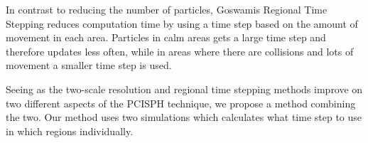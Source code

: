 \documentclass[../../main.tex]{subfiles}
\begin{document}
In contrast to reducing the number of particles, Goswamis Regional Time Stepping \cite{} reduces computation time by using a time step based on the amount of movement in each area. Particles in calm areas gets a large time step and therefore updates less often, while in areas where there are collisions and lots of movement a smaller time step is used. 

Seeing as the two-scale resolution and regional time stepping methods improve on two different aspects of the PCISPH technique, we propose a method combining the two. Our method uses two simulations which calculates what time step to use in which regions individually. 


\end{document}
